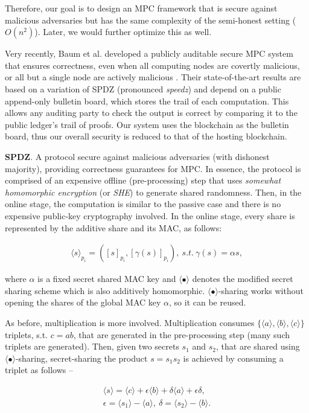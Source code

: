\documentclass{article} \usepackage{nips13submit_e,times}
\begin{document}
Therefore, our goal is to design an MPC framework that is secure against malicious adversaries but has the same complexity of the semi-honest setting ($O(n^2)$). Later, we would further optimize this as well.

Very recently, Baum et al. developed a publicly auditable secure MPC system that ensures correctness, even when all computing nodes are covertly malicious, or all but a single node are actively malicious \cite{baum14}. Their state-of-the-art results are based on a variation of SPDZ (pronounced \textit{speedz}) \cite{spdz} and depend on a public append-only bulletin board, which stores the trail of each computation. This allows any auditing party to check the output is correct by comparing it to the public ledger's trail of proofs. Our system uses the blockchain as the bulletin board, thus our overall security is reduced to that of the hosting blockchain.

\textbf{SPDZ}. A protocol secure against malicious adversaries (with dishonest majority), providing correctness guarantees for MPC. In essence, the protocol is comprised of an expensive offline (pre-processing) step that uses \textit{somewhat homomorphic encryption} (or \textit{SHE}) to generate shared randomness. Then, in the online stage, the computation is similar to the passive case and there is no expensive public-key cryptography involved. In the online stage, every share is represented by the additive share and its MAC, as follows:

\begin{eqnarray}
	\langle s \rangle_{p_i} = ([s]_{p_i}, [\gamma(s)]_{p_i}),\ s.t.\ 
	\gamma(s) = \alpha s,
\end{eqnarray}

where $\alpha$ is a fixed secret shared MAC key and $\langle \bullet \rangle$ denotes the modified secret sharing scheme which is also additively homomorphic. $\langle \bullet \rangle$-sharing works without opening the shares of the global MAC key $\alpha$, so it can be reused.

As before, multiplication is more involved. Multiplication consumes $\{ \langle a \rangle, \langle b \rangle, \langle c \rangle \}$ triplets, s.t. $c = ab$, that are generated in the pre-processing step (many such triplets are generated). Then, given two secrets $s_1$ and $s_2$, that are shared using $\langle \bullet \rangle$-sharing, secret-sharing the product $s = s_1 s_2$ is achieved by consuming a triplet as follows --

\begin{eqnarray}
	\langle s \rangle = \langle c \rangle + \epsilon \langle b \rangle + \delta \langle a \rangle + \epsilon \delta,\\
	\epsilon = \langle s_1 \rangle - \langle a \rangle,\ \delta = \langle s_2 \rangle - \langle b \rangle.
\end{eqnarray}
\end{document}
